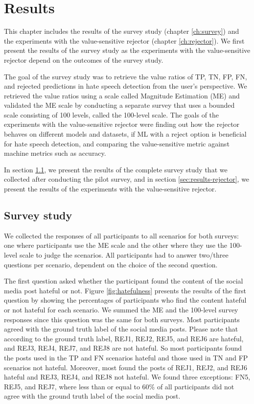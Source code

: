 \chapter{Results}
This chapter includes the results of the survey study (chapter \ref{ch:survey}) and the experiments with the value-sensitive rejector (chapter \ref{ch:rejector}).
%
We first present the results of the survey study as the experiments with the value-sensitive rejector depend on the outcomes of the survey study.
%

%
The goal of the survey study was to retrieve the value ratios of TP, TN, FP, FN, and rejected predictions in hate speech detection from the user's perspective.
%
We retrieved the value ratios using a scale called Magnitude Estimation (ME) and validated the ME scale by conducting a separate survey that uses a bounded scale consisting of 100 levels, called the 100-level scale.
%
The goals of the experiments with the value-sensitive rejector were finding out how the rejector behaves on different models and datasets, if ML with a reject option is beneficial for hate speech detection, and comparing the value-sensitive metric against machine metrics such as accuracy.
%

%
In section \ref{sec:results-survey-study}, we present the results of the complete survey study that we collected after conducting the pilot survey, and in section \ref{sec:results-rejector}, we present the results of the experiments with the value-sensitive rejector.

\section{Survey study}
\label{sec:results-survey-study}
We collected the responses of all participants to all scenarios for both surveys: one where participants use the ME scale and the other where they use the 100-level scale to judge the scenarios.
%
All participants had to answer two/three questions per scenario, dependent on the choice of the second question.
%

%
The first question asked whether the participant found the content of the social media post hateful or not.
%
Figure \ref{fig:hatefulness} presents the results of the first question by showing the percentages of participants who find the content hateful or not hateful for each scenario.
%
We summed the ME and the 100-level survey responses since this question was the same for both surveys.
%
Most participants agreed with the ground truth label of the social media posts.
%
Please note that according to the ground truth label, REJ1, REJ2, REJ5, and REJ6 are hateful, and REJ3, REJ4, REJ7, and REJ8 are not hateful.
%
So most participants found the posts used in the TP and FN scenarios hateful and those used in TN and FP scenarios not hateful.
%
Moreover, most found the posts of REJ1, REJ2, and REJ6 hateful and REJ3, REJ4, and REJ8 not hateful.
%
We found three exceptions: FN5, REJ5, and REJ7, where less than or equal to 60\% of all participants did not agree with the ground truth label of the social media post.
%

